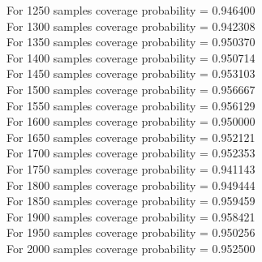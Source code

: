 \documentclass{article}
\begin{document}
For 1250 samples coverage probability = 0.946400\\
For 1300 samples coverage probability = 0.942308\\
For 1350 samples coverage probability = 0.950370\\
For 1400 samples coverage probability = 0.950714\\
For 1450 samples coverage probability = 0.953103\\
For 1500 samples coverage probability = 0.956667\\
For 1550 samples coverage probability = 0.956129\\
For 1600 samples coverage probability = 0.950000\\
For 1650 samples coverage probability = 0.952121\\
For 1700 samples coverage probability = 0.952353\\
For 1750 samples coverage probability = 0.941143\\
For 1800 samples coverage probability = 0.949444\\
For 1850 samples coverage probability = 0.959459\\
For 1900 samples coverage probability = 0.958421\\
For 1950 samples coverage probability = 0.950256\\
For 2000 samples coverage probability = 0.952500\\
\end{document}
